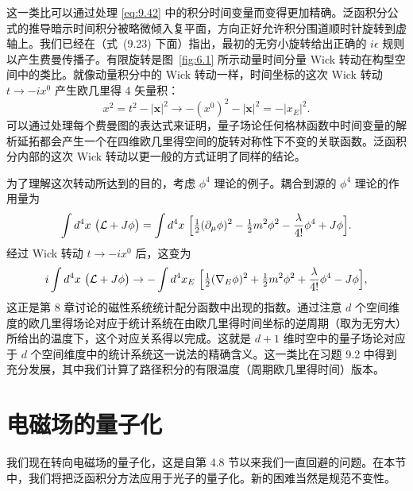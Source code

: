这一类比可以通过处理 \eqref{eq:9.42} 中的积分时间变量而变得更加精确。泛函积分公式的推导暗示时间积分被略微倾入复平面，方向正好允许积分围道顺时针旋转到虚轴上。我们已经在（式~(9.23) 下面）指出，最初的无穷小旋转给出正确的 $i\epsilon$ 规则以产生费曼传播子。有限旋转是图~\ref{fig:6.1} 所示动量时间分量 Wick 转动在构型空间中的类比。就像动量积分中的 Wick 转动一样，时间坐标的这次 Wick 转动 $t\to -ix^0$ 产生欧几里得 4 矢量积：
\begin{equation}
  x^2 = t^2 - |\mathbf{x}|^2 \to -(x^0)^2 - |\mathbf{x}|^2 = -|x_E|^2 .
  \label{eq:9.44}
\end{equation}
可以通过处理每个费曼图的表达式来证明，量子场论任何格林函数中时间变量的解析延拓都会产生一个在四维欧几里得空间的旋转对称性下不变的关联函数。泛函积分内部的这次 Wick 转动以更一般的方式证明了同样的结论。

为了理解这次转动所达到的目的，考虑 $\phi^4$ 理论的例子。耦合到源的 $\phi^4$ 理论的作用量为
\begin{equation}
  \int d^4x\ \bigl( \mathcal{L} + J\phi \bigr) = \int d^4x\ \Bigl[
    \tfrac{1}{2}(\partial_\mu\phi)^2 - \tfrac{1}{2}m^2\phi^2
      - \frac{\lambda}{4!}\phi^4 + J\phi \Bigr] .
\end{equation}
经过 Wick 转动 $t\to -ix^0$ 后，这变为
\begin{equation}
  i\int d^4x\ \bigl( \mathcal{L}+J\phi \bigr) \to -\int d^4x_E\ \Bigl[
    \tfrac{1}{2}(\nabla_E\phi)^2 + \tfrac{1}{2}m^2\phi^2
      + \frac{\lambda}{4!}\phi^4 - J\phi \Bigr] ,
\end{equation}
这正是第 8 章讨论的磁性系统统计配分函数中出现的指数。通过注意 $d$ 个空间维度的欧几里得场论对应于统计系统在由欧几里得时间坐标的逆周期（取为无穷大）所给出的温度下，这个对应关系得以完成。这就是 $d+1$ 维时空中的量子场论对应于 $d$ 个空间维度中的统计系统这一说法的精确含义。这一类比在习题 9.2 中得到充分发展，其中我们计算了路径积分的有限温度（周期欧几里得时间）版本。

\section{电磁场的量子化}

我们现在转向电磁场的量子化，这是自第 4.8 节以来我们一直回避的问题。在本节中，我们将把泛函积分方法应用于光子的量子化。新的困难当然是规范不变性。


